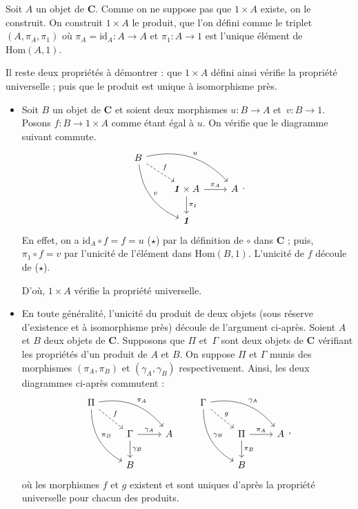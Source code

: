 \documentclass{../../td}
\let\bm\boldsymbol
\begin{document}
  Soit $A$ un objet de $\mathbf{C}$.
  Comme on ne suppose pas que $\bm{\mathit{1}} \times A$ existe, on le construit.
  On construit $\bm{\mathit{1}} \times A$ le produit, que l'on défini comme le triplet $(A, \pi_A, \pi_{\bm{\mathit{1}}})$ où $\pi_A = \mathrm{id}_A : A \to A$ et $\pi_{\bm{\mathit{1}}} : A \to \bm{\mathit{1}}$ est l'unique élément de $\mathrm{Hom}(A, \bm{\mathit{1}})$.

  Il reste deux propriétés à démontrer : que $\bm{\mathit{1}} \times A$ défini ainsi vérifie la propriété universelle ; puis que le produit est unique à isomorphisme près.
  \begin{itemize}
    \item Soit $B$ un objet de $\mathbf{C}$ et soient deux morphismes $u : B \to A$ et~$v : B \to \bm{\mathit{1}}$.
      Posons $f : B \to \bm{\mathit{1}} \times A$ comme étant égal à $u$.
      On vérifie que le diagramme suivant commute.
      \[
      \begin{tikzcd}
        B \arrow[bend left]{drr}{u} \arrow[bend right]{ddr}{v} \arrow[dashed]{dr}{f}\\
        & \bm{\mathit{1}} \times A \arrow{r}{\pi_A} \arrow{d}{\pi_{\bm{\mathit{1}}}} & A\\
        & \bm{\mathit{1}}
      \end{tikzcd}
      .\] 
      En effet, on a $\mathrm{id}_A \circ f = f = u$ ($\star$) par la définition de $\circ$ dans $\mathbf{C}$ ; puis, $\pi_{\bm{\mathit{1}}} \circ f = v$ par l'unicité de l'élément dans $\mathrm{Hom}(B, \bm{\mathit{1}})$.
      L'unicité de $f$ découle de ($\star$).

      D'où, $\bm{\mathit{1}} \times A$ vérifie la propriété universelle.
    \item En toute généralité, l'unicité du produit de deux objets (sous réserve d'existence et à isomorphisme près) découle de l'argument ci-après.
      Soient $A$ et $B$ deux objets de $\mathbf{C}$.
      Supposons que $\Pi$ et~$\Gamma$ sont deux objets de $\mathbf{C}$ vérifiant les propriétés d'un produit de $A$ et $B$.
      On suppose $\Pi$ et $\Gamma$ munis des morphismes $(\pi_A, \pi_B)$ et $(\gamma_A, \gamma_B)$ respectivement.
      Ainsi, les deux diagrammes ci-après commutent :
      \[
      \begin{tikzcd}
        \Pi \arrow[dashed]{dr}{f}\arrow[bend left]{drr}{\pi_A}\arrow[bend right]{ddr}{\pi_B} \\
        & \Gamma \arrow{r}{\gamma_A} \arrow{d}{\gamma_B} & A\\
        & B
      \end{tikzcd}
      \quad\quad
      \begin{tikzcd}
        \Gamma \arrow[dashed]{dr}{g}\arrow[bend left]{drr}{\gamma_A}\arrow[bend right]{ddr}{\gamma_B} \\
        & \Pi \arrow{r}{\pi_A} \arrow{d}{\pi_B} & A\\
        & B
      \end{tikzcd}
      ,\]
      où les morphismes $f$ et $g$ existent et sont uniques d'après la propriété universelle pour chacun des produits.


\end{itemize}
\end{document}
